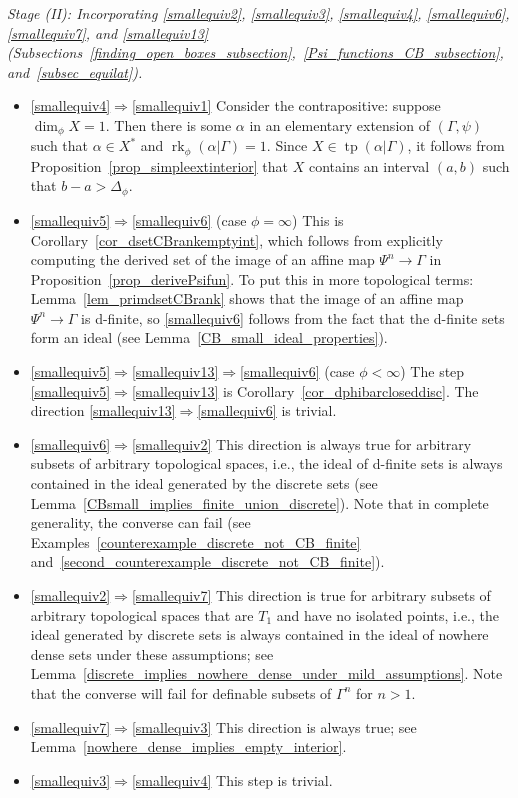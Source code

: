 \documentclass[11pt]{amsart}
\theoremstyle{plain}
\theoremstyle{definition}
\numberwithin{equation}{section}
\newcommand\0{\varnothing}
\begin{document}
\emph{Stage (II): Incorporating \eqref{smallequiv2}, \eqref{smallequiv3}, \eqref{smallequiv4}, \eqref{smallequiv6},
\eqref{smallequiv7},
and \eqref{smallequiv13} (Subsections~\ref{finding_open_boxes_subsection},~\ref{Psi_functions_CB_subsection}, and~\ref{subsec_equilat}).}
\begin{itemize}
\item \eqref{smallequiv4}$\Rightarrow$\eqref{smallequiv1} Consider the contrapositive: suppose $\operatorname{dim}_{\phi}X=1$. Then there is some $\alpha$ in an elementary extension of $(\Gamma,\psi)$ such that $\alpha\in X^*$ and $\operatorname{rk}_{\phi}(\alpha|\Gamma)=1$. Since $X\in\operatorname{tp}(\alpha|\Gamma)$, it follows from Proposition~\ref{prop_simpleextinterior} that $X$ contains an interval $(a,b)$ such that $b-a>\Delta_{\phi}$.
\item \eqref{smallequiv5}$\Rightarrow$\eqref{smallequiv6} (case $\phi=\infty$) This is Corollary~\ref{cor_dsetCBrankemptyint}, which follows from explicitly computing the derived set of the image of an affine map $\Psi^n\to\Gamma$ in Proposition~\ref{prop_derivePsifun}. To put this in more topological terms: Lemma~\ref{lem_primdsetCBrank} shows that the image of an affine map $\Psi^n\to\Gamma$ is d-finite, so \eqref{smallequiv6} follows from the fact that the d-finite sets form an ideal (see Lemma~\ref{CB_small_ideal_properties}).
\item \eqref{smallequiv5}$\Rightarrow$\eqref{smallequiv13}$\Rightarrow$\eqref{smallequiv6} (case $\phi<\infty$) The step \eqref{smallequiv5}$\Rightarrow$\eqref{smallequiv13} is Corollary~\ref{cor_dphibarcloseddisc}. The direction \eqref{smallequiv13}$\Rightarrow$\eqref{smallequiv6} is trivial.
\item \eqref{smallequiv6}$\Rightarrow$\eqref{smallequiv2} This direction is always true for arbitrary subsets of arbitrary topological spaces, i.e., the ideal of d-finite sets is always contained in the ideal generated by the discrete sets (see Lemma~\ref{CBsmall_implies_finite_union_discrete}). Note that in complete generality, the converse can fail (see Examples~\ref{counterexample_discrete_not_CB_finite} and~\ref{second_counterexample_discrete_not_CB_finite}).
\item  \eqref{smallequiv2}$\Rightarrow$\eqref{smallequiv7} This direction is true for arbitrary subsets of arbitrary topological spaces that are $T_1$ and have no isolated points, i.e., the ideal generated by discrete sets is always contained in the ideal of nowhere dense sets under these assumptions; see Lemma~\ref{discrete_implies_nowhere_dense_under_mild_assumptions}. Note that the converse will fail for definable subsets of $\Gamma^n$ for $n>1$.
\item  \eqref{smallequiv7}$\Rightarrow$\eqref{smallequiv3} This direction is always true; see Lemma~\ref{nowhere_dense_implies_empty_interior}.
\item \eqref{smallequiv3}$\Rightarrow$\eqref{smallequiv4} This step is trivial. 
\end{itemize}
\end{document}
